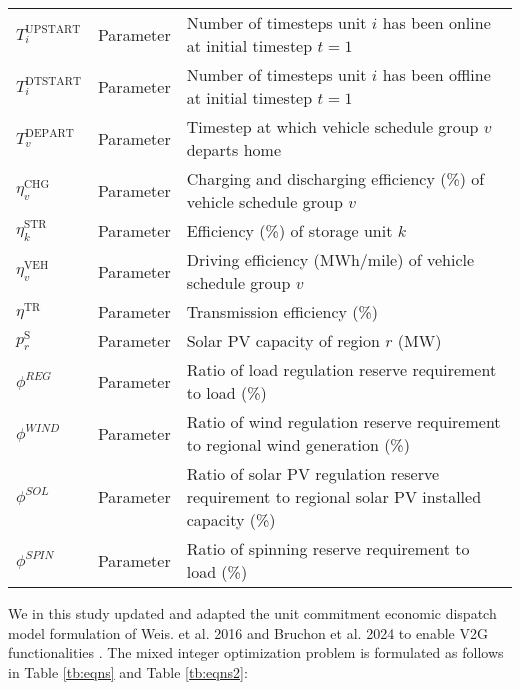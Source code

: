 \documentclass[9pt,twoside,lineno]{pnas-new}
\begin{document}
\begin{table}[!ht]
\begin{center}
\begin{tabular}{lll}
      $T^{\mathrm{UPSTART}}_{i} $ & Parameter & Number of timesteps unit $i$ has been online at initial timestep $t=1$ \\
      $T^{\mathrm{DTSTART}}_{i} $ & Parameter & Number of timesteps unit $i$ has been offline at initial timestep $t=1$ \\
      $T_v^{\mathrm{DEPART}}$ & Parameter & Timestep at which vehicle schedule group $v$ departs home\\      
      $\eta^{\mathrm{CHG}}_{v}$ & Parameter & Charging and discharging efficiency (\%) of vehicle schedule group $v$\\
      $\eta^{\mathrm{STR}}_k$ & Parameter & Efficiency (\%) of storage unit $k$\\
      $\eta^{\mathrm{VEH}}_{v}$ & Parameter & Driving efficiency (MWh/mile) of vehicle schedule group $v$\\
      $\eta^{\mathrm{TR}}$ & Parameter & Transmission efficiency (\%)\\
      $p^{\mathrm{S}}_r$ & Parameter & Solar PV capacity of region $r$ (MW)\\
      $\phi^{REG}$ & Parameter & Ratio of load regulation reserve requirement to load (\%)\\
      $\phi^{WIND}$ & Parameter & Ratio of wind regulation reserve requirement to regional wind generation (\%)\\     
      $\phi^{SOL}$ & Parameter & Ratio of solar PV regulation reserve requirement to regional solar PV installed capacity (\%)\\     
      $\phi^{SPIN}$ & Parameter & Ratio of spinning reserve requirement to load (\%)\\
      \hline

    \end{tabular}
  \end{center}
\end{table}


We in this study updated and adapted the unit commitment economic dispatch model formulation of Weis. et al. 2016 and Bruchon et al. 2024 to enable V2G functionalities \cite{weis_consequential_2016,bruchon_cleaning_2024}. The mixed integer optimization problem is formulated as follows in Table \ref{tb:eqns} and Table \ref{tb:eqns2}:\\
\newpage
\end{document}
